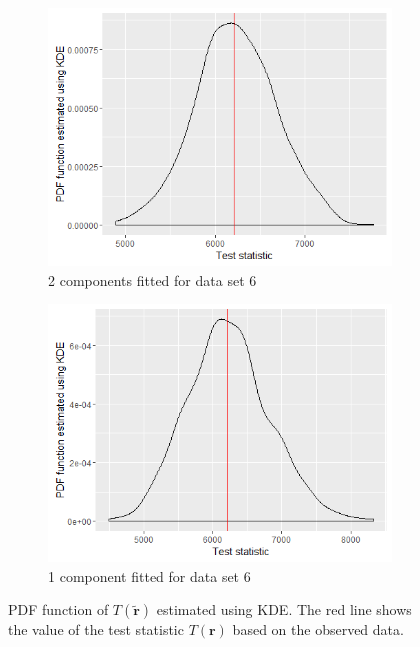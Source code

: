 \begin{figure}[!htb]
\begin{subfigure}[b]{0.4\textwidth}
		\includegraphics[width=\textwidth]{mainmatter/chapter_5_simulation_study/ppc_5wellsep2comp.png}
          \caption{\label{fig : ppc_5wellsep2comp}2 components fitted for data set 6}
	\end{subfigure}
	\begin{subfigure}[b]{0.4\textwidth}
		\includegraphics[width=\textwidth]{mainmatter/chapter_5_simulation_study/ppc_5wellsep1comp.png}
          \caption{\label{fig : ppc_5wellsep1comp}1 component fitted for data set 6}
	\end{subfigure}
	\caption{PDF function of $T(\boldsymbol{\tilde{r}})$ estimated using KDE. The red line shows the value of the test statistic $T(\boldsymbol{r})$ based on the observed data.}
	\label{fig : ppc_5wellsepcomp}    
\end{figure}

